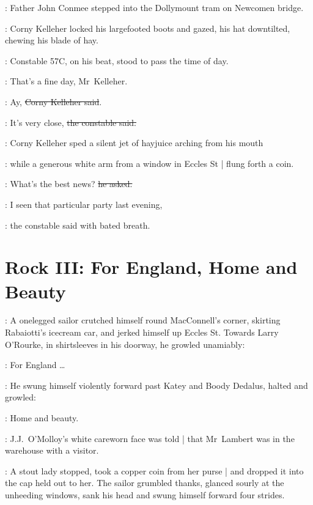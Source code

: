 \begin{interject}
    :
    Father John Conmee stepped into the Dollymount tram on Newcomen bridge.
\end{interject}

:
Corny Kelleher locked his largefooted boots and gazed,
his hat downtilted,
chewing his blade of hay.

:
Constable 57C,
on his beat,
stood to pass the time of day.

\constable:
That's a fine day, Mr~Kelleher.

\corny:
Ay, \sout{Corny Kelleher said}.

\constable:
It's very close,%
\sout{the constable said.}

:
Corny Kelleher sped a silent jet of hayjuice arching from his mouth

\begin{interject}
    :
    while a generous white arm from a window in Eccles St |
    flung forth a coin.
\end{interject}

\corny:
What's the best news? \sout{he asked.}

\constable:
I seen that particular party last evening,

:
the constable said with bated breath.


\section*{Rock III: For England, Home and Beauty}

:
A onelegged sailor crutched himself round MacConnell's corner,
skirting Rabaiotti's icecream car,
and jerked himself up Eccles St.
Towards Larry O'Rourke,%
in shirtsleeves in his doorway,
he growled unamiably:

\sailor:
For England \ldots

:
He swung himself violently forward past Katey and Boody Dedalus,
halted and growled:

\sailor:
Home and beauty.

\begin{interject}
    :
    J.J.~O'Molloy's white careworn face was told |
    that Mr~Lambert was in the warehouse with a visitor.
\end{interject}

:
A stout lady stopped,
took a copper coin from her purse |
and dropped it into the cap held out to her.
The sailor grumbled thanks,
glanced sourly at the unheeding windows,%
sank his head
and swung himself forward four strides.

